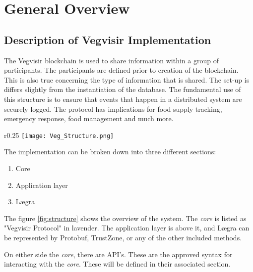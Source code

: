 \chapter{General Overview}

\section{Description of Vegvisir Implementation}

The Vegvisir blockchain is used to share information within a group of
participants. The participants are defined prior to creation of the blockchain.
This is also true concerning the type of information that is shared. The set-up
is differs slightly from the instantiation of the database. The fundamental
use of this structure is to ensure that events that happen in a distributed
system are securely logged. The protocol has implications for food supply
tracking, emergency response, food management and much more.

\begin{wrapfigure}{r}{0.25\textwidth}
    \texttt{[image: Veg\_Structure.png]}
    \caption{Vegvisir Structure}
    \label{fig:structure}
\end{wrapfigure}

The implementation can be broken down into three different sections:
\begin{enumerate}
    \item{ Core }
    \item{ Application layer }
    \item{ Lægra }
\end{enumerate}
The figure \ref{fig:structure} shows the overview of the system. The
\emph{core} is listed as "Vegvisir Protocol" in lavender. The application layer
is above it, and Lægra can be represented by Protobuf,
TrustZone, or any of the other included methods.

On either side the \emph{core}, there are API's. These are the approved syntax
for interacting with the \emph{core}. These will be defined in their
associated section.
